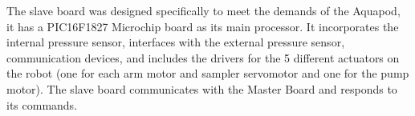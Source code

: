 The slave board was designed specifically to meet the demands of the Aquapod, it has a PIC16F1827 Microchip board as its main processor. It incorporates the internal pressure sensor, interfaces with the external pressure sensor, communication devices, and includes the drivers for the 5 different actuators on the robot (one for each arm motor and sampler servomotor and one for the pump motor). The slave board communicates with the Master Board and responds to its commands.   











